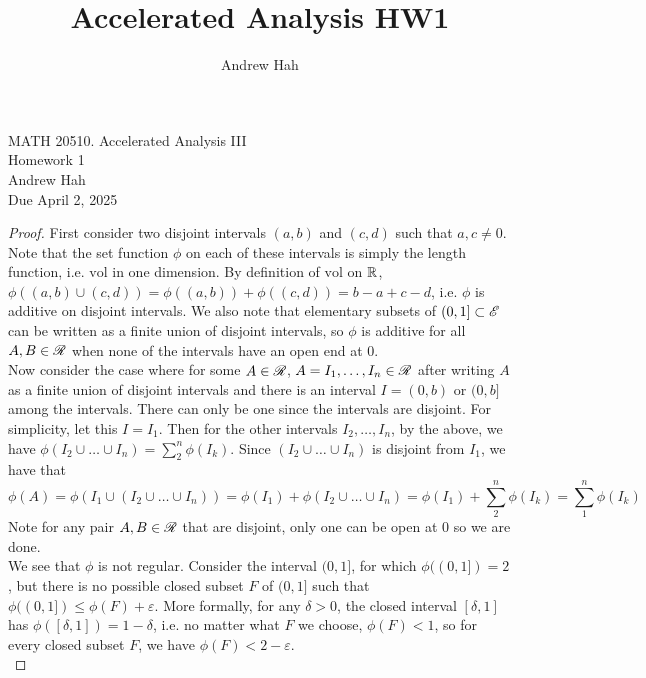 \documentclass[11pt]{article}
\title{Accelerated Analysis HW1}
\author{Andrew Hah}
\let\eps\varepsilon
\begin{document}
\pagestyle{plain}
\begin{center}
{\Large MATH 20510. Accelerated Analysis III} \\
{\Large Homework 1} \\
\vspace{.2in}  
Andrew Hah \\
Due April 2, 2025
\end{center}

\begin{exercise}{11.15}
    \begin{proof}
        First consider two disjoint intervals $(a, b)$ and $(c, d)$ such that $a, c \neq 0$. Note that the set function $\phi$ on each of these intervals is simply the length function, i.e. $\mathrm{vol}$ in one dimension. By definition of $\mathrm{vol}$ on $\mathbb{R}$, $\phi((a, b) \cup (c, d)) = \phi((a, b)) + \phi((c, d)) = b - a + c - d$, i.e. $\phi$ is additive on disjoint intervals. We also note that elementary subsets of $(0, 1] \subset \mathscr{E}$ can be written as a finite union of disjoint intervals, so $\phi$ is additive for all $A, B \in \mathscr{R}$ when none of the intervals have an open end at $0$. \\
        
        Now consider the case where for some $A \in \mathscr{R}$, $A = I_1, \dots, I_n \in \mathscr{R}$ after writing $A$ as a finite union of disjoint intervals and there is an interval $I = (0, b)$ or $(0, b]$ among the intervals. There can only be one since the intervals are disjoint. For simplicity, let this $I = I_1$. Then for the other intervals $I_2, \dots, I_n$, by the above, we have $\phi(I_2 \cup \dots \cup I_n) = \sum_2^n \phi(I_k)$. Since $(I_2 \cup \dots \cup I_n)$ is disjoint from $I_1$, we have that $$\phi(A) = \phi(I_1 \cup (I_2 \cup \dots \cup I_n)) = \phi(I_1) + \phi(I_2 \cup \dots \cup I_n) = \phi(I_1) + \sum_2^n \phi(I_k) = \sum_1^n \phi(I_k)$$ Note for any pair $A, B \in \mathscr{R}$ that are disjoint, only one can be open at $0$ so we are done. \\

        We see that $\phi$ is not regular. Consider the interval $(0, 1]$, for which $\phi((0, 1]) = 2$, but there is no possible closed subset $F$ of $(0, 1]$ such that $\phi((0, 1]) \le \phi(F) + \eps$. More formally, for any $\delta > 0$, the closed interval $[\delta, 1]$ has $\phi([\delta, 1]) = 1 - \delta$, i.e. no matter what $F$ we choose, $\phi(F) < 1$, so for every closed subset $F$, we have $\phi(F) < 2 - \eps$. \\


\end{proof}
\end{exercise}
\end{document}
